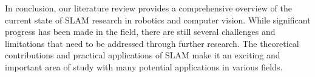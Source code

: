 \documentclass[conference]{IEEEtran}
\begin{document}
In conclusion, our literature review provides a comprehensive overview of the current state of SLAM research in robotics and computer vision. While significant progress has been made in the field, there are still several challenges and limitations that need to be addressed through further research. The theoretical contributions and practical applications of SLAM make it an exciting and important area of study with many potential applications in various fields.



\end{document}
